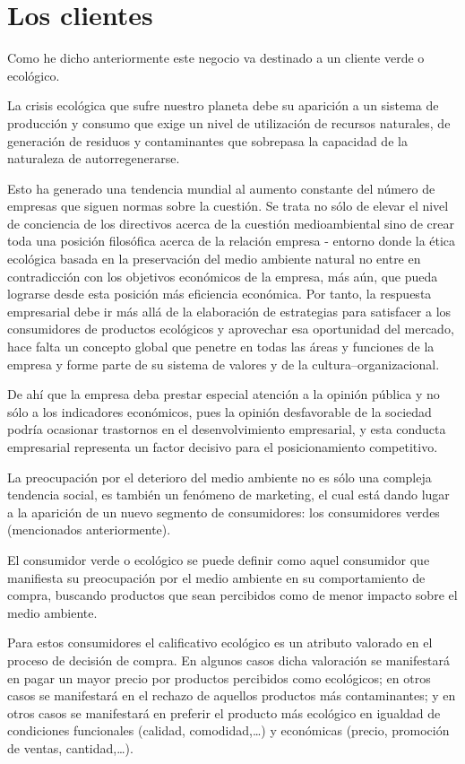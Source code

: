 \section{Los clientes}
\label{sec:clientes}

Como he dicho anteriormente este negocio va destinado a un cliente verde o ecológico.

La crisis ecológica que sufre nuestro planeta debe su aparición a un sistema de producción y consumo que exige un nivel de utilización de recursos naturales, de generación de residuos y contaminantes que sobrepasa la capacidad de la naturaleza de autorregenerarse.

Esto ha generado una tendencia mundial al aumento constante del número de empresas que siguen normas sobre la cuestión. Se trata no sólo de elevar el nivel de conciencia de los directivos acerca de la cuestión medioambiental sino de crear toda una posición filosófica acerca de la relación empresa - entorno donde la ética ecológica basada en la preservación del medio ambiente natural no entre en contradicción con los objetivos económicos de la empresa, más aún, que pueda lograrse desde esta posición más eficiencia económica. Por tanto, la respuesta empresarial debe ir más allá de la elaboración de estrategias para satisfacer a los consumidores de productos ecológicos y aprovechar esa oportunidad del mercado, hace falta un concepto global que penetre en todas las áreas y funciones de la empresa y forme parte de su sistema de valores y de la cultura--organizacional. 

De ahí que la empresa deba prestar especial atención a la opinión pública y no sólo a los indicadores económicos, pues la opinión desfavorable de la sociedad podría ocasionar trastornos   en  el  desenvolvimiento empresarial, y  esta conducta empresarial representa un factor decisivo para el posicionamiento competitivo.

La preocupación por el deterioro del medio ambiente no es sólo una  compleja  tendencia social, es también un fenómeno de marketing, el cual está dando lugar a la aparición de un nuevo segmento de consumidores: los consumidores verdes (mencionados anteriormente).

El consumidor verde o ecológico se puede definir como aquel consumidor que manifiesta su preocupación por el medio ambiente en su comportamiento de compra, buscando productos que sean percibidos como de menor impacto sobre el medio ambiente.

Para estos consumidores el calificativo ecológico es un atributo valorado en el proceso de decisión de compra. En algunos casos dicha valoración se manifestará en pagar un mayor precio por productos percibidos como ecológicos; en otros casos se manifestará en el rechazo de aquellos productos más contaminantes; y en otros casos se manifestará en preferir el producto más ecológico en igualdad de condiciones funcionales (calidad, comodidad,…) y económicas (precio, promoción de ventas, cantidad,…).

